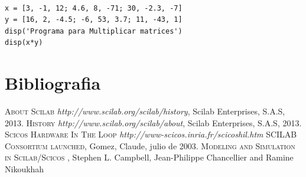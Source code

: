 \documentclass[11pt]{article} %
\begin{document}
\begin{lstlisting}[caption= Código escrito en Scilab para multiplicar dos matrices, label=amb, frame=single]  % Start your code-block

x = [3, -1, 12; 4.6, 8, -71; 30, -2.3, -7]
y = [16, 2, -4.5; -6, 53, 3.7; 11, -43, 1]
disp('Programa para Multiplicar matrices')
disp(x*y)

\end{lstlisting}

\section{Bibliografia}

\begin{thebibliography}{X}
 \textsc{About Scilab} \textit{http://www.scilab.org/scilab/history}, Scilab Enterprises,
S.A.S, 2013.
 \textsc{History }  \textit{http://www.scilab.org/scilab/about}, Scilab Enterprises,
S.A.S, 2013.
 \textsc{Scicos Hardware In The Loop }  \textit{ http://www-scicos.inria.fr/scicoshil.htm}
 \textsc{SCILAB Consortium launched}, Gomez, Claude, julio de 2003.
 \textsc{Modeling and Simulation in Scilab/Scicos }, Stephen L. Campbell, Jean-Philippe Chancellier and Ramine Nikoukhah

\end{thebibliography}
\end{document}
